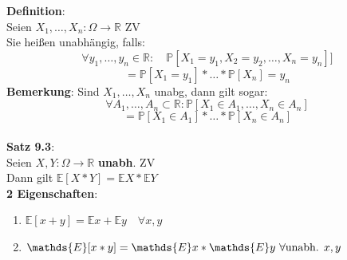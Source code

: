 \textbf{Definition}:\\
Seien $X_1,\dots,X_n : \Omega \rightarrow\mathds{R}$ ZV\\
Sie heißen unabhängig, falls: 
$$\forall y_1,\dots,y_n \in \mathds{R}: \quad \mathds{P}[X_1 = y_1,X_2 =y_2,\dots,X_n=y_n]]$$
$$=\mathds{P}[X_1=y_1]*\dots*\mathds{P}[X_n]=y_n$$
\textbf{Bemerkung}: Sind $X_1,\dots,X_n$ unabg, dann gilt sogar:
$$\forall A_1,\dots,A_n \subset \mathds{R}: \mathds{P}[X_1 \in A_1,\dots,X_n \in A_n]$$
$$=\mathds{P}[X_1 \in A_1]*\dots*\mathds{P}[X_n \in A_n]$$\medskip\\
\textbf{Satz 9.3}:\\
Seien $X,Y :\Omega \rightarrow \mathds{R} $ \textbf{unabh}. ZV\\
Dann gilt $\mathds{E}[X*Y]= \mathds{E}X*\mathds{E}Y$\medskip\\
\textbf{2 Eigenschaften}:
\begin{enumerate}
	\item $\mathds{E}[x+y] = \mathds{E}x+\mathds{E}y \quad \forall x,y$
	\item $ \mathds{E}[x*y] = \mathds{E}x*\mathds{E}\text{$ y $ } \forall \text{unabh. } x,y$
\end{enumerate}